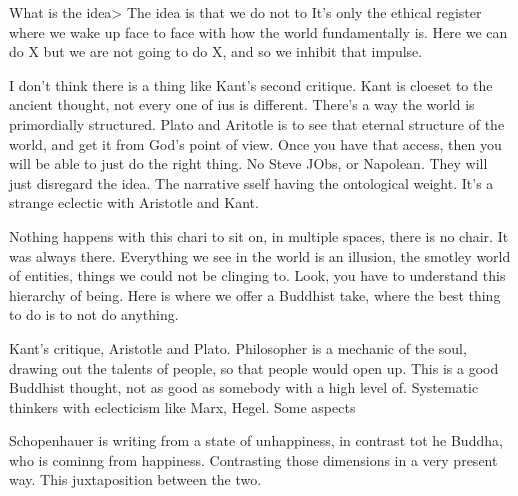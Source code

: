 \documentclass[12pt,letterpaper]{article}
\begin{document}
What is the idea> The idea is that we do not to  It's only the ethical register where we wake up face to face with how the world fundamentally is.  Here we can do X but we are not going to do X, and so we inhibit that impulse.

I don't think there is a thing like Kant's second critique.  Kant is cloeset to the ancient thought, not every one of ius is different.  There's a way the world is primordially structured.  Plato and Aritotle is to see that eternal structure of the world, and get it from God's point of view.  Once you have that access, then you will be able to just do the right thing.  No Steve JObs, or Napolean.  They will just disregard the idea.  The narrative sself having the ontological weight.  It's a strange eclectic with Aristotle and Kant.

Nothing happens with this chari to sit on, in multiple spaces, there is no chair.  It was always there.  Everything we see in the world is an illusion, the smotley world of entities, things we could not be clinging to.  Look, you have to understand this hierarchy of being.  Here is where we offer a Buddhist take, where the best thing to do is to not do anything.

Kant's critique, Aristotle and Plato.  Philosopher is a mechanic of the soul, drawing out the talents of people, so that people would open up.  This is a good Buddhist thought, not as good as somebody with a high level of.  Systematic thinkers with eclecticism like Marx, Hegel.  Some aspects 

Schopenhauer is writing from a state of unhappiness, in contrast tot he Buddha, who is cominng from happiness.  Contrasting those dimensions in a very present way.  This juxtaposition between the two.  
\end{document}
